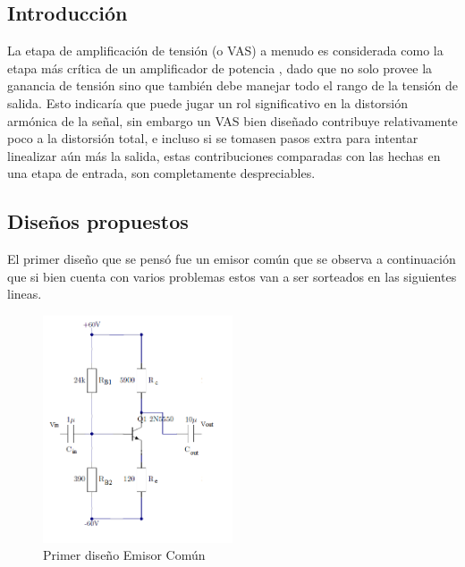 %
%
%

\subsection{Introducción}
La etapa de amplificación de tensión (o VAS) a menudo es considerada como la etapa más crítica de un amplificador de potencia , dado que no solo provee la ganancia de tensión sino que también debe manejar todo el rango de la tensión de salida. Esto indicaría que puede jugar un rol significativo en la distorsión armónica de la señal, sin embargo un VAS bien diseñado contribuye relativamente poco a la distorsión total, e incluso si se tomasen pasos extra para intentar linealizar aún más la salida, estas contribuciones comparadas con las hechas en una etapa de entrada, son completamente despreciables.\\
\subsection{Diseños propuestos}
El primer diseño que se pensó fue un emisor común que se observa a continuación que si bien  cuenta con varios problemas estos van  a ser sorteados en las siguientes lineas.
\begin{figure}[H]
\centering
	\includegraphics[width=0.5\textwidth]{ImagenesGain-Stage/ec1.png}
	\caption{Primer diseño Emisor Común}
	\label{fig:ec1}
\end{figure}

